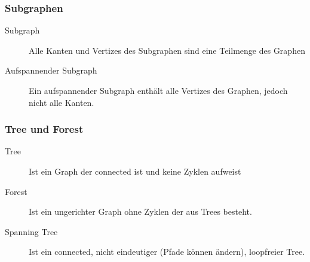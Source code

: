 \subsubsection{Subgraphen}
\begin{description}
	\item[Subgraph] Alle Kanten und Vertizes des Subgraphen sind eine Teilmenge des Graphen
	\item[Aufspannender Subgraph] Ein aufspannender Subgraph enthält alle Vertizes des Graphen, jedoch nicht alle Kanten.
\end{description}

\subsubsection{Tree und Forest}
\begin{description}
	\item[Tree] Ist ein Graph der connected ist und keine Zyklen aufweist
	\item[Forest] Ist ein ungerichter Graph ohne Zyklen der aus Trees besteht.
	\item[Spanning Tree] Ist ein connected, nicht eindeutiger (Pfade können ändern), loopfreier Tree.
\end{description}

